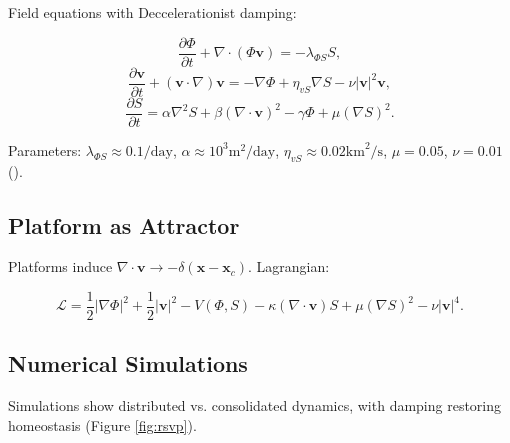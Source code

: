\documentclass[12pt]{article}
\begin{document}
Field equations with Deccelerationist damping:

\[
\frac{\partial \Phi}{\partial t} + \nabla \cdot (\Phi \mathbf{v}) = -\lambda_{\Phi S} S,
\]
\[
\frac{\partial \mathbf{v}}{\partial t} + (\mathbf{v} \cdot \nabla) \mathbf{v} = -\nabla \Phi + \eta_{vS} \nabla S - \nu |\mathbf{v}|^2 \mathbf{v},
\]
\[
\frac{\partial S}{\partial t} = \alpha \nabla^2 S + \beta (\nabla \cdot \mathbf{v})^2 - \gamma \Phi + \mu (\nabla S)^2.
\]

Parameters: \(\lambda_{\Phi S} \approx 0.1/\text{day}\), \(\alpha \approx 10^3 \text{m}^2/\text{day}\), \(\eta_{vS} \approx 0.02 \text{km}^2/\text{s}\), \(\mu = 0.05\), \(\nu = 0.01\) (\citealp{Gleeson2014,Yasseri2012}).

\subsection{Platform as Attractor}

Platforms induce \(\nabla \cdot \mathbf{v} \to -\delta(\mathbf{x} - \mathbf{x}_c)\). Lagrangian:

\[
\mathcal{L} = \frac{1}{2} |\nabla \Phi|^2 + \frac{1}{2} |\mathbf{v}|^2 - V(\Phi, S) - \kappa (\nabla \cdot \mathbf{v}) S + \mu (\nabla S)^2 - \nu |\mathbf{v}|^4.
\]

\subsection{Numerical Simulations}

Simulations show distributed vs. consolidated dynamics, with damping restoring homeostasis (Figure \ref{fig:rsvp}).
\end{document}
